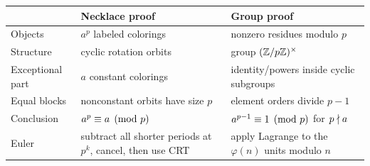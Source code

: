 \begin{center}
\small
\begin{tabularx}{\textwidth}{p{}XX}
\toprule
 & Necklace proof & Group proof \\
\midrule
Objects & $a^p$ labeled colorings & nonzero residues modulo $p$ \\
Structure & cyclic rotation orbits & group $(\mathbb Z/p\mathbb Z)^\times$ \\
Exceptional part & $a$ constant colorings & identity/powers inside cyclic subgroups \\
Equal blocks & nonconstant orbits have size $p$ & element orders divide $p-1$ \\
Conclusion & $a^p\equiv a\pmod p$ & $a^{p-1}\equiv1\pmod p$ for $p\nmid a$ \\
Euler & subtract all shorter periods at $p^k$, cancel, then use CRT & apply Lagrange to the $\varphi(n)$ units modulo $n$ \\
\bottomrule
\end{tabularx}
\end{center}
